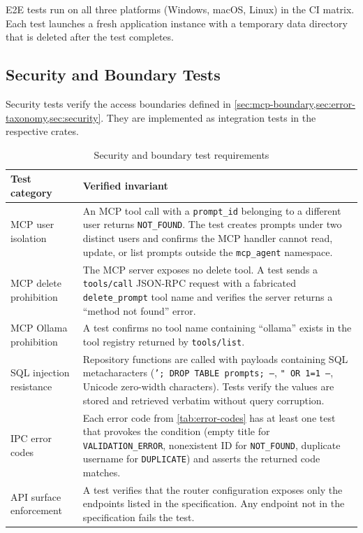 \documentclass[a4paper, 11pt, oneside]{report}
\begin{document}
E2E tests run on all three platforms (Windows, macOS, Linux) in the CI
matrix.  Each test launches a fresh application instance with a
temporary data directory that is deleted after the test completes.

\subsection{Security and Boundary Tests}
\label{sec:security-tests}

Security tests verify the access boundaries defined in
\cref{sec:mcp-boundary,sec:error-taxonomy,sec:security}.  They are
implemented as integration tests in the respective crates.

\begin{table}[H]
  \centering
  \caption{Security and boundary test requirements}
  \label{tab:security-tests}
  \begin{tabularx}{\textwidth}{l X}
    \toprule
    \textbf{Test category} & \textbf{Verified invariant} \\
    \midrule
    MCP user isolation &
      An MCP tool call with a \texttt{prompt\_id} belonging to a
      different user returns \texttt{NOT\_FOUND}.  The test creates
      prompts under two distinct users and confirms the MCP handler
      cannot read, update, or list prompts outside the
      \texttt{mcp\_agent} namespace. \\
    MCP delete prohibition &
      The MCP server exposes no delete tool.  A test sends a
      \texttt{tools/call} JSON-RPC request with a fabricated
      \texttt{delete\_prompt} tool name and verifies the server
      returns a ``method not found'' error. \\
    MCP Ollama prohibition &
      A test confirms no tool name containing ``ollama'' exists in
      the tool registry returned by \texttt{tools/list}. \\
    SQL injection resistance &
      Repository functions are called with payloads containing SQL
      metacharacters (\texttt{'; DROP TABLE prompts; --},
      \texttt{" OR 1=1 --}, Unicode zero-width characters).  Tests
      verify the values are stored and retrieved verbatim without
      query corruption. \\
    IPC error codes &
      Each error code from \cref{tab:error-codes} has at least one
      test that provokes the condition (empty title for
      \texttt{VALIDATION\_ERROR}, nonexistent ID for
      \texttt{NOT\_FOUND}, duplicate username for \texttt{DUPLICATE})
      and asserts the returned code matches. \\
    API surface enforcement &
      A test verifies that the router configuration exposes only
      the endpoints listed in the specification.
      Any endpoint not in the specification fails the test. \\
    \bottomrule
  \end{tabularx}
\end{table}
\end{document}
